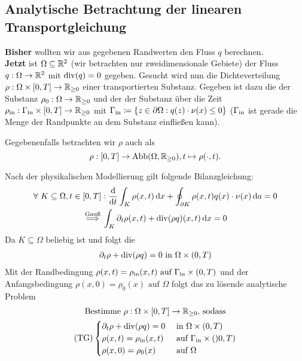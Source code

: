 \subsection{Analytische Betrachtung der linearen Transportgleichung}
\textbf{Bisher} wollten wir aus gegebenen Randwerten den Fluss $ q $ berechnen.\\
\textbf{Jetzt} ist $ \Omega \subseteq \mathbb{R}^2 $ (wir betrachten nur zweidimensionale Gebiete) der Fluss $ q: \Omega \to \mathbb{R}^2 $ mit $ \operatorname{div}(q) = 0 $ gegeben. Gesucht wird nun die Dichteverteilung $ \rho: \Omega \times [0,T] \to \mathbb{R}_{\geq 0} $ einer 
transportierten Substanz. Gegeben ist dazu die  der Substanz $ \rho_0:  \Omega \to \mathbb{R}_{\geq 0}$ und der  der Substanz über die Zeit $ \rho_{\text{in}}: \Gamma_{{\text{in}}} \times [0,T] \to \mathbb{R}_{\geq 0} $ mit $ \Gamma_{{\text{in}}} \coloneqq \{ z \in \partial \Omega: q(z) \cdot \nu(x) \leq 0 \} $ ($ \Gamma_{{\text{in}}} $ ist gerade die Menge der Randpunkte an dem Substanz einfließen kann).

Gegebenenfalls betrachten wir $ \rho $ auch als 
\[ \rho: [0,T] \to \operatorname{Abb}(\Omega, \mathbb{R}_{\geq 0}), t \mapsto \rho(\cdot,t). \]

Nach der physikalischen Modellierung gilt folgende Bilanzgleichung:
\begin{gather*}
	\forall \ K \subseteq \Omega, t \in [0,T]: \frac{\mathop{}\!\mathrm{d}}{\mathop{}\!\mathrm{d} t} \int_K \rho(x,t) \mathop{}\!\mathrm{d} x + \oint_{\partial K} \rho(x,t) q(x) \cdot \nu(x) \mathop{}\!\mathrm{d} a = 0 \\
	\stackrel{\text{Gauß}}{\implies} \int_K \partial_t \rho(x,t) + \operatorname{div}(\rho q)(x,t) \mathop{}\!\mathrm{d} x = 0 
\end{gather*}
Da $ K \subseteq \Omega $ beliebig ist und  folgt die 
\begin{gather*}
	\partial_t \rho + \operatorname{div}(\rho q) = 0 \text{ in } \Omega \times (0,T) 
\end{gather*}
Mit der Randbedingung $ \rho(x,t) = \rho_{\text{in}}(x,t) \text{ auf } \Gamma_{{\text{in}}} \times (0,T)$ und der Anfangsbedingung $ \rho(x,0) = \rho_0(x) \text{ auf } \Omega $ folgt das zu lösende analytische Problem
\begin{gather*}
	\text{Bestimme } \rho: \Omega \times [0,T] \to \mathbb{R}_{\geq 0} \text{, sodass}\\
	\operatorname{(TG)}
	\begin{cases}
		\partial_t \rho + \operatorname{div}(\rho q) = 0 &\text{ in } \Omega \times (0,T)\\
		\rho(x,t) = \rho_{\text{in}}(x,t) &\text{ auf } \Gamma_{{\text{in}}} \times ()0,T)\\
		\rho(x,0) = \rho_0(x) &\text{ auf } \Omega
	\end{cases}
\end{gather*}


